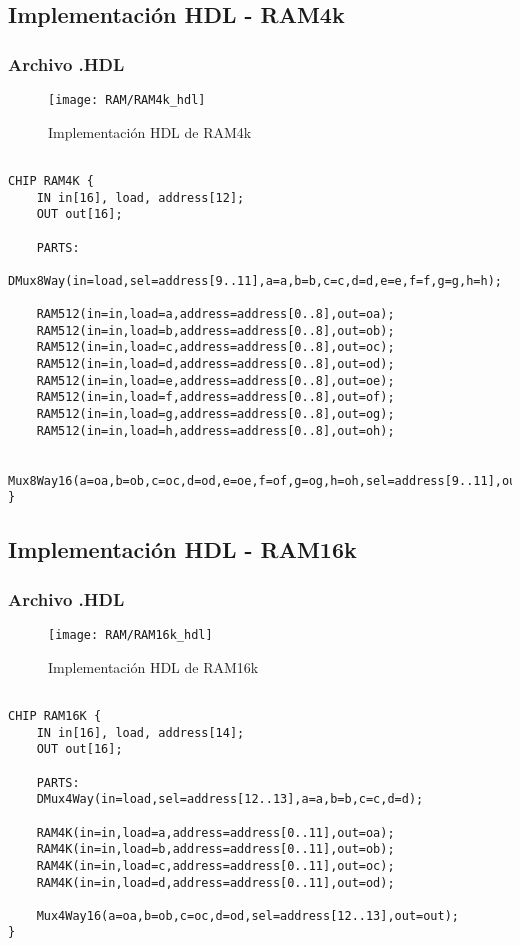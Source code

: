 \documentclass[12pt]{article}
\begin{document}
	\subsection{Implementación HDL - RAM4k}

  	\subsubsection{Archivo .HDL}
	\begin{figure}[H]
		\centering
		\texttt{[image: RAM/RAM4k\_hdl]}
		\caption{Implementación HDL de RAM4k}
		\label{fig:ram4khdl}
	\end{figure}
  	\begin{lstlisting}

CHIP RAM4K {
	IN in[16], load, address[12];
	OUT out[16];

	PARTS:
	DMux8Way(in=load,sel=address[9..11],a=a,b=b,c=c,d=d,e=e,f=f,g=g,h=h);

	RAM512(in=in,load=a,address=address[0..8],out=oa);
	RAM512(in=in,load=b,address=address[0..8],out=ob);
	RAM512(in=in,load=c,address=address[0..8],out=oc);
	RAM512(in=in,load=d,address=address[0..8],out=od);
	RAM512(in=in,load=e,address=address[0..8],out=oe);
	RAM512(in=in,load=f,address=address[0..8],out=of);
	RAM512(in=in,load=g,address=address[0..8],out=og);
	RAM512(in=in,load=h,address=address[0..8],out=oh);

	Mux8Way16(a=oa,b=ob,c=oc,d=od,e=oe,f=of,g=og,h=oh,sel=address[9..11],out=out);
}

  	\end{lstlisting}

  	    \subsection{Implementación HDL - RAM16k}

  	\subsubsection{Archivo .HDL}

\begin{figure}[H]
	\centering
	\texttt{[image: RAM/RAM16k\_hdl]}
	\caption{Implementación HDL de RAM16k}
	\label{fig:ram16khdl}
\end{figure}
  	\begin{lstlisting}

CHIP RAM16K {
	IN in[16], load, address[14];
	OUT out[16];

	PARTS:
	DMux4Way(in=load,sel=address[12..13],a=a,b=b,c=c,d=d);

	RAM4K(in=in,load=a,address=address[0..11],out=oa);
	RAM4K(in=in,load=b,address=address[0..11],out=ob);
	RAM4K(in=in,load=c,address=address[0..11],out=oc);
	RAM4K(in=in,load=d,address=address[0..11],out=od);

	Mux4Way16(a=oa,b=ob,c=oc,d=od,sel=address[12..13],out=out);
}

  	\end{lstlisting}

\newpage
\printbibliography[heading=bibintoc]
\end{document}
